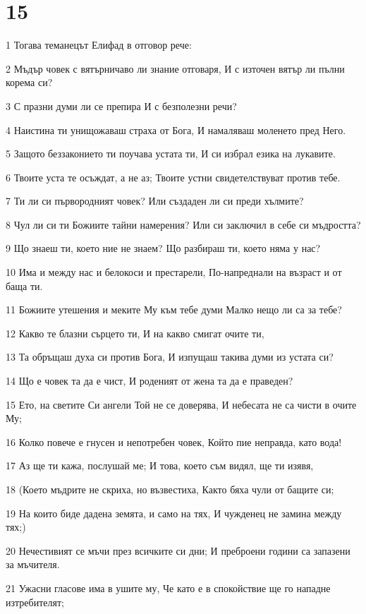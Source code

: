 \chapter{15}

\par 1 Тогава теманецът Елифад в отговор рече:
\par 2 Мъдър човек с вятърничаво ли знание отговаря, И с източен вятър ли пълни корема си?
\par 3 С празни думи ли се препира И с безполезни речи?
\par 4 Наистина ти унищожаваш страха от Бога, И намаляваш моленето пред Него.
\par 5 Защото беззаконието ти поучава устата ти, И си избрал езика на лукавите.
\par 6 Твоите уста те осъждат, а не аз; Твоите устни свидетелствуват против тебе.
\par 7 Ти ли си първородният човек? Или създаден ли си преди хълмите?
\par 8 Чул ли си ти Божиите тайни намерения? Или си заключил в себе си мъдростта?
\par 9 Що знаеш ти, което ние не знаем? Що разбираш ти, което няма у нас?
\par 10 Има и между нас и белокоси и престарели, По-напреднали на възраст и от баща ти.
\par 11 Божиите утешения и меките Му към тебе думи Малко нещо ли са за тебе?
\par 12 Какво те блазни сърцето ти, И на какво смигат очите ти,
\par 13 Та обръщаш духа си против Бога, И изпущаш такива думи из устата си?
\par 14 Що е човек та да е чист, И роденият от жена та да е праведен?
\par 15 Ето, на светите Си ангели Той не се доверява, И небесата не са чисти в очите Му;
\par 16 Колко повече е гнусен и непотребен човек, Който пие неправда, като вода!
\par 17 Аз ще ти кажа, послушай ме; И това, което съм видял, ще ти изявя,
\par 18 (Което мъдрите не скриха, но възвестиха, Както бяха чули от бащите си;
\par 19 На които биде дадена земята, и само на тях, И чужденец не замина между тях;)
\par 20 Нечестивият се мъчи през всичките си дни; И преброени години са запазени за мъчителя.
\par 21 Ужасни гласове има в ушите му, Че като е в спокойствие ще го нападне изтребителят;
